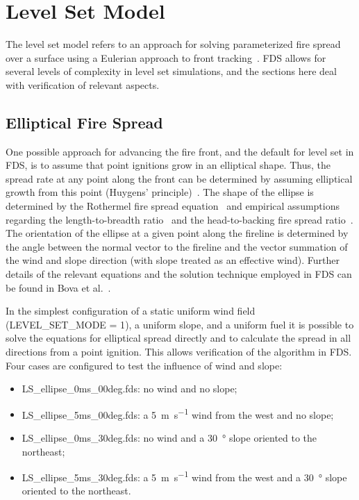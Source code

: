 \documentclass[11pt]{book}
\begin{document}
\section{Level Set Model}

The level set model refers to an approach for solving parameterized fire spread over a surface using a Eulerian approach to front tracking~\cite{Rehm:LevelSet}. FDS allows for several levels of complexity in level set simulations, and the sections here deal with verification of relevant aspects.

\subsection{Elliptical Fire Spread}
One possible approach for advancing the fire front, and the default for level set in FDS, is to assume that point ignitions grow in an elliptical shape. Thus, the spread rate at any point along the front can be determined by assuming elliptical growth from this point (Huygens' principle)~\cite{Richards:1990,Finney:FARSITE}. The shape of the ellipse is determined by the Rothermel fire spread equation~\cite{Rothermel:1972} and empirical assumptions regarding the length-to-breadth ratio~\cite{Anderson:1983} and the head-to-backing fire spread ratio~\cite{Finney:FARSITE}. The orientation of the ellipse at a given point along the fireline is determined by the angle between the normal vector to the fireline and the vector summation of the wind and slope direction (with slope treated as an effective wind). Further details of the relevant equations and the solution technique employed in FDS can be found in Bova et al.~\cite{Bova:IJWF2015}.

In the simplest configuration of a static uniform wind field ({\ct LEVEL\_SET\_MODE = 1}), a uniform slope, and a uniform fuel it is possible to solve the equations for elliptical spread directly and to calculate the spread in all directions from a point ignition. This allows verification of the algorithm in FDS. Four cases are configured to test the influence of wind and slope:

\begin{itemize}
  \item {\ct LS\_ellipse\_0ms\_00deg.fds}: no wind and no slope;
  \item {\ct LS\_ellipse\_5ms\_00deg.fds}: a \SI[per-mode=symbol]{5}{\meter\per\second} wind from the west and no slope;
  \item {\ct LS\_ellipse\_0ms\_30deg.fds}: no wind and a \SI{30}{\degree} slope oriented to the northeast;
  \item {\ct LS\_ellipse\_5ms\_30deg.fds}: a \SI[per-mode=symbol]{5}{\meter\per\second} wind from the west and a \SI{30}{\degree} slope oriented to the northeast.
\end{itemize}
\end{document}
